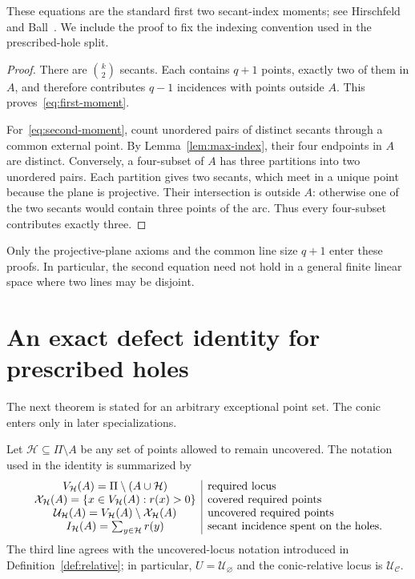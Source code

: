 \documentclass[11pt]{article}
\theoremstyle{definition}
\theoremstyle{remark}
\newcommand{\cC}{\mathcal{C}}
\newcommand{\cH}{\mathcal{H}}
\newcommand{\cU}{\mathcal{U}}
\newcommand{\cX}{\mathcal{X}}
\newcommand{\IH}{I_{\cH}}
\begin{document}
These equations are the standard first two secant-index moments; see
Hirschfeld~\cite[Chapter~9]{Hirschfeld1998} and
Ball~\cite[p.~34]{Ball1997}.  We include the proof to fix the indexing
convention used in the prescribed-hole split.

\begin{proof}
There are $\binom{k}{2}$ secants.  Each contains $q+1$ points, exactly two
of them in $A$, and therefore contributes $q-1$ incidences with points
outside $A$.  This proves~\eqref{eq:first-moment}.

For~\eqref{eq:second-moment}, count unordered pairs of distinct secants
through a common external point.  By Lemma~\ref{lem:max-index}, their four
endpoints in $A$ are distinct.  Conversely, a four-subset of $A$ has three
partitions into two unordered pairs.  Each partition gives two secants,
which meet in a unique point because the plane is projective.  Their
intersection is outside $A$: otherwise one of the two secants would contain
three points of the arc.  Thus every four-subset contributes exactly three.
\end{proof}

Only the projective-plane axioms and the common line size $q+1$ enter these
proofs.  In particular, the second equation need not hold in a general
finite linear space where two lines may be disjoint.

\section{An exact defect identity for prescribed holes}
\label{sec:defect}

The next theorem is stated for an arbitrary exceptional point set.  The
conic enters only in later specializations.

Let $\cH\subseteq\Pi\setminus A$ be any set of points allowed to remain
uncovered.  The notation used in the identity is summarized by
\[
\begin{array}{c|l}
V_{\cH}(A)=\Pi\setminus(A\cup\cH)&\text{required locus}\cr
\cX_{\cH}(A)=\{x\in V_{\cH}(A):r(x)>0\}&\text{covered required points}\cr
\cU_{\cH}(A)=V_{\cH}(A)\setminus\cX_{\cH}(A)&\text{uncovered required points}\cr
\IH(A)=\sum_{y\in\cH}r(y)&\text{secant incidence spent on the holes.}
\end{array}
\]
The third line agrees with the uncovered-locus notation introduced in
Definition~\ref{def:relative}; in particular, $U=\cU_{\varnothing}$ and the
conic-relative locus is $\cU_{\cC}$.
\end{document}
